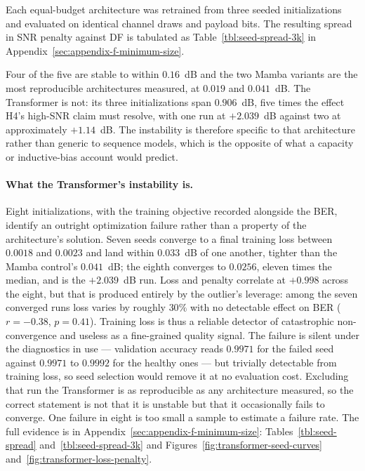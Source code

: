 Each equal-budget architecture was retrained from three seeded initializations and evaluated on identical channel draws and payload bits. The resulting spread in SNR penalty against DF is tabulated as Table~\ref{tbl:seed-spread-3k} in Appendix~\ref{sec:appendix-f-minimum-size}.

Four of the five are stable to within $0.16$~dB and the two Mamba variants are the most reproducible architectures measured, at $0.019$ and $0.041$~dB. The Transformer is not: its three initializations span $0.906$~dB, five times the effect H4's high-SNR claim must resolve, with one run at $+2.039$~dB against two at approximately $+1.14$~dB. The instability is therefore specific to that architecture rather than generic to sequence models, which is the opposite of what a capacity or inductive-bias account would predict.

\paragraph{What the Transformer's instability is.} Eight initializations, with the training objective recorded alongside the BER, identify an outright optimization failure rather than a property of the architecture's solution. Seven seeds converge to a final training loss between $0.0018$ and $0.0023$ and land within $0.033$~dB of one another, tighter than the Mamba control's $0.041$~dB; the eighth converges to $0.0256$, eleven times the median, and is the $+2.039$~dB run. Loss and penalty correlate at $+0.998$ across the eight, but that is produced entirely by the outlier's leverage: among the seven converged runs loss varies by roughly $30\%$ with no detectable effect on BER ($r=-0.38$, $p=0.41$). Training loss is thus a reliable detector of catastrophic non-convergence and useless as a fine-grained quality signal. The failure is silent under the diagnostics in use --- validation accuracy reads $0.9971$ for the failed seed against $0.9971$ to $0.9992$ for the healthy ones --- but trivially detectable from training loss, so seed selection would remove it at no evaluation cost. Excluding that run the Transformer is as reproducible as any architecture measured, so the correct statement is not that it is unstable but that it occasionally fails to converge. One failure in eight is too small a sample to estimate a failure rate. The full evidence is in Appendix~\ref{sec:appendix-f-minimum-size}: Tables~\ref{tbl:seed-spread} and~\ref{tbl:seed-spread-3k} and Figures~\ref{fig:transformer-seed-curves} and~\ref{fig:transformer-loss-penalty}.

